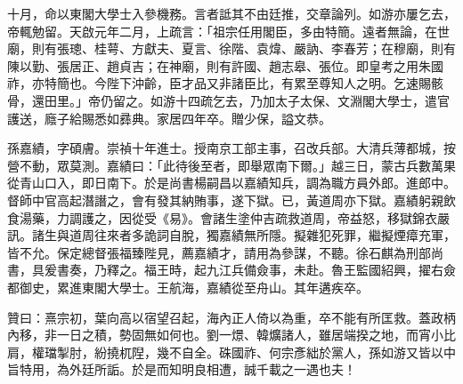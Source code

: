 \begin{pinyinscope}
十月，命以東閣大學士入參機務。言者詆其不由廷推，交章論列。如游亦屢乞去，帝輒勉留。天啟元年二月，上疏言：「祖宗任用閣臣，多由特簡。遠者無論，在世廟，則有張璁、桂萼、方獻夫、夏言、徐階、袁煒、嚴訥、李春芳；在穆廟，則有陳以勤、張居正、趙貞吉；在神廟，則有許國、趙志皋、張位。即皇考之用朱國祚，亦特簡也。今陛下沖齡，臣才品又非諸臣比，有累至尊知人之明。乞速賜骸骨，還田里。」帝仍留之。如游十四疏乞去，乃加太子太保、文淵閣大學士，遣官護送，廕子給賜悉如彞典。家居四年卒。贈少保，謚文恭。

孫嘉績，字碩膚。崇禎十年進士。授南京工部主事，召改兵部。大清兵薄都城，按營不動，眾莫測。嘉績曰：「此待後至者，即舉眾南下爾。」越三日，蒙古兵數萬果從青山口入，即日南下。於是尚書楊嗣昌以嘉績知兵，調為職方員外郎。進郎中。督師中官高起潛譖之，會有發其納賄事，遂下獄。已，黃道周亦下獄。嘉績躬親飲食湯藥，力調護之，因從受《易》。會諸生塗仲吉疏救道周，帝益怒，移獄錦衣嚴訊。諸生與道周往來者多詭詞自脫，獨嘉績無所隱。擬雜犯死罪，繼擬煙瘴充軍，皆不允。保定總督張福臻陛見，薦嘉績才，請用為參謀，不聽。徐石麒為刑部尚書，具爰書奏，乃釋之。福王時，起九江兵備僉事，未赴。魯王監國紹興，擢右僉都御史，累進東閣大學士。王航海，嘉績從至舟山。其年遘疾卒。

贊曰：熹宗初，葉向高以宿望召起，海內正人倚以為重，卒不能有所匡救。蓋政柄內移，非一日之積，勢固無如何也。劉一燝、韓爌諸人，雖居端揆之地，而宵小比肩，權璫掣肘，紛撓杌隉，幾不自全。硃國祚、何宗彥絀於黨人，孫如游又皆以中旨特用，為外廷所詬。於是而知明良相遭，誠千載之一遇也夫！


\end{pinyinscope}
